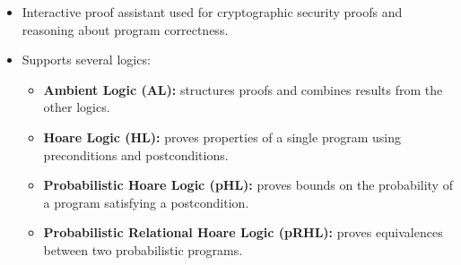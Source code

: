 \begin{frame}{\EasyCrypt}
  \begin{itemize}
      \setlength{\itemsep}{3mm}
    \item Interactive proof assistant used for cryptographic security proofs
      and reasoning about program correctness.
    \item Supports several logics:
      \begin{itemize}
          \setlength{\itemsep}{2mm}
        \item \textbf{Ambient Logic (AL):} structures proofs and combines
          results from the other logics.
        \item \textbf{Hoare Logic (HL):} proves properties of a single
          program using preconditions and postconditions.
        \item \textbf{Probabilistic Hoare Logic (pHL):} proves bounds on
          the probability of a program satisfying a postcondition.
        \item \textbf{Probabilistic Relational Hoare Logic (pRHL):}
          proves equivalences between two probabilistic programs.
      \end{itemize}
  \end{itemize}
\end{frame}
